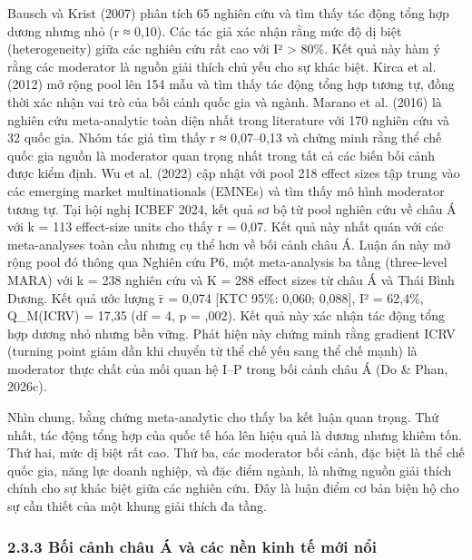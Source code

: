 \documentclass[12pt,a4paper]{article}
\begin{document}
Bausch và Krist (2007) phân tích 65 nghiên cứu và tìm thấy tác động tổng
hợp dương nhưng nhỏ (r ≈ 0,10). Các tác giả xác nhận rằng mức độ dị biệt
(heterogeneity) giữa các nghiên cứu rất cao với I² \textgreater{} 80\%.
Kết quả này hàm ý rằng các moderator là nguồn giải thích chủ yếu cho sự
khác biệt. Kirca et al. (2012) mở rộng pool lên 154 mẫu và tìm thấy tác
động tổng hợp tương tự, đồng thời xác nhận vai trò của bối cảnh quốc gia
và ngành. Marano et al. (2016) là nghiên cứu meta-analytic toàn diện
nhất trong literature với 170 nghiên cứu và 32 quốc gia. Nhóm tác giả
tìm thấy r ≈ 0,07--0,13 và chứng minh rằng thể chế quốc gia nguồn là
moderator quan trọng nhất trong tất cả các biến bối cảnh được kiểm định.
Wu et al. (2022) cập nhật với pool 218 effect sizes tập trung vào các
emerging market multinationals (EMNEs) và tìm thấy mô hình moderator
tương tự. Tại hội nghị ICBEF 2024, kết quả sơ bộ từ pool nghiên cứu về
châu Á với k = 113 effect-size units cho thấy r = 0,07. Kết quả này nhất
quán với các meta-analyses toàn cầu nhưng cụ thể hơn về bối cảnh châu Á.
Luận án này mở rộng pool đó thông qua Nghiên cứu P6, một meta-analysis
ba tầng (three-level MARA) với k = 238 nghiên cứu và K = 288 effect
sizes từ châu Á và Thái Bình Dương. Kết quả ước lượng r̄ = 0,074 {[}KTC
95\%: 0,060; 0,088{]}, I² = 62,4\%, Q\_M(ICRV) = 17,35 (df = 4, p =
,002). Kết quả này xác nhận tác động tổng hợp dương nhỏ nhưng bền vững.
Phát hiện này chứng minh rằng gradient ICRV (turning point giảm dần khi
chuyển từ thể chế yếu sang thể chế mạnh) là moderator thực chất của mối
quan hệ I--P trong bối cảnh châu Á (Do \& Phan, 2026c).

Nhìn chung, bằng chứng meta-analytic cho thấy ba kết luận quan trọng.
Thứ nhất, tác động tổng hợp của quốc tế hóa lên hiệu quả là dương nhưng
khiêm tốn. Thứ hai, mức dị biệt rất cao. Thứ ba, các moderator bối cảnh,
đặc biệt là thể chế quốc gia, năng lực doanh nghiệp, và đặc điểm ngành,
là những nguồn giải thích chính cho sự khác biệt giữa các nghiên cứu.
Đây là luận điểm cơ bản biện hộ cho sự cần thiết của một khung giải
thích đa tầng.

\hypertarget{233-bux1ed1i-cux1ea3nh-chuxe2u-uxe1-vuxe0-cuxe1c-nux1ec1n-kinh-tux1ebf-mux1edbi-nux1ed5i}{%
\subsubsection{2.3.3 Bối cảnh châu Á và các nền kinh tế mới
nổi}\label{233-bux1ed1i-cux1ea3nh-chuxe2u-uxe1-vuxe0-cuxe1c-nux1ec1n-kinh-tux1ebf-mux1edbi-nux1ed5i}}
\end{document}
